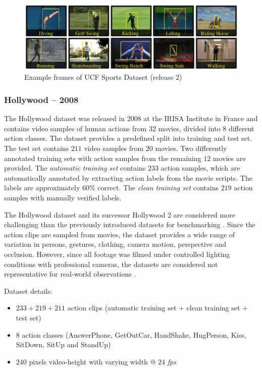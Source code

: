 \begin{figure}[H]
    \centering
    \includegraphics[width=\textwidth]{img_datasets/ucfsports2_example}
    \caption{Example frames of UCF Sports Dataset (release 2) \cite{soomro_action_2014}}
    \label{fig:ucfsports2_example}
\end{figure}


\subsubsection{Hollywood -- 2008}
The Hollywood dataset \cite{laptev_learning_2008} was released in 2008 at the IRISA Institute in France and contains video samples of human actions from $32$ movies, divided into $8$ different action classes.
The dataset provides a predefined split into training and test set.
The test set contains $211$ video samples from $20$ movies.
Two differently annotated training sets with action samples from the remaining $12$ movies are provided.
The \textit{automatic training set} contains $233$ action samples, which are automatically annotated by extracting action labels from the movie scripts.
The labels are approximately 60\% correct.
The \textit{clean training set} contains $219$ action samples with manually verified labels.

The Hollywood dataset and its successor Hollywood 2 are considered more challenging than the previously introduced datasets for benchmarking \cite{chaquet_survey_2013}.
Since the action clips are sampled from movies, the dataset provides a wide range of variation in persons, gestures, clothing, camera motion, perspective and occlusion.
However, since all footage was filmed under controlled lighting conditions with professional cameras, the datasets are considered not representative for real-world observations \cite{kang_review_2016}.

Dataset details: \cite{_ivan_????}
\begin{itemize}
    \item $233 + 219 + 211$ action clips (automatic training set + clean training set + test set)
    \item $8$ action classes (AnswerPhone, GetOutCar, HandShake, HugPerson, Kiss, SitDown, SitUp and StandUp)
    \item $240$ pixels video-height with varying width @ $24$ \textit{fps} 
\end{itemize}

